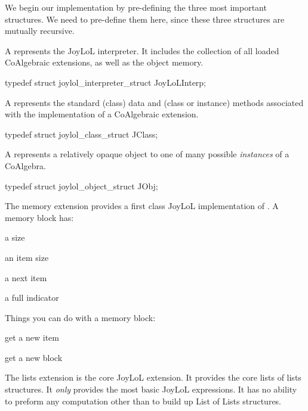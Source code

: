 We begin our implementation by pre-defining the three most important 
structures. We need to pre-define them here, since these three structures 
are mutually recursive. 

\startitemize

\item A  represents the JoyLoL interpreter. It includes 
the collection of all loaded CoAlgebraic extensions, as well as the object 
memory. 

\startCHeader 
typedef struct joylol_interpreter_struct JoyLoLInterp;
\stopCHeader 

\item A  represents the standard (class) data and (class 
or instance) methods associated with the implementation of a CoAlgebraic 
extension. 

\startCHeader
typedef struct joylol_class_struct JClass;
\stopCHeader

\item A  represents a relatively opaque object to one of 
many possible \emph{instances} of a CoAlgebra. 

\startCHeader
typedef struct joylol_object_struct JObj;
\stopCHeader 
\stopitemize

The memory extension provides a first class JoyLoL implementation of 
. A memory block has:

\startitemize

\item a size

\item an item size

\item a next item

\item a full indicator

\stopitemize

Things you can do with a memory block:

\startitemize

\item get a new item

\item get a new block

\stopitemize

The lists extension is the core JoyLoL extension. It provides the core 
lists of lists structures. It \emph{only} provides the most basic JoyLoL 
expressions. It has no ability to preform any computation other than to 
build up List of Lists structures. 

